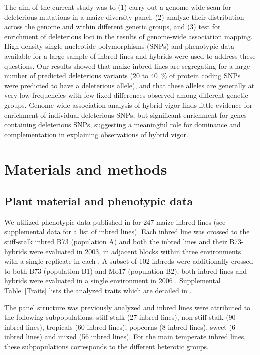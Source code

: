 \documentclass[12pt]{article}
\begin{document}
The aim of the current study was to (1) carry out a genome-wide scan for deleterious mutations in a maize diversity panel, (2) analyze their distribution across the genome and within different genetic groups, and (3) test for enrichment of deleterious loci in the results of genome-wide association mapping. High density single nucleotide polymorphisms (SNPs) and phenotypic data available for a large sample of inbred lines and hybrids were used to address these questions. Our results showed that maize inbred lines are segregating for a large number of predicted deleterious variants (20 to 40 \,\% of protein coding SNPs were predicted to have a deleterious allele), and that these alleles are generally at very low frequencies with few fixed differences observed among different genetic groups. Genome-wide association analysis of hybrid vigor finds little evidence for enrichment of individual deleterious SNPs, but significant enrichment for genes containing deleterious SNPs, suggesting a meaningful role for dominance and complementation in explaining observations of hybrid vigor. 

\section*{Materials and methods}
\subsection*{Plant material and phenotypic data}

We utilized phenotypic data published in \citet{Flint-Garcia2005} for 247 maize inbred lines (see supplemental data for a list of inbred lines). Each inbred line was crossed to the stiff-stalk inbred B73 (population A) and both the inbred lines and their B73-hybrids were evaluated in 2003, in adjacent blocks within three environments with a single replicate in each \citep{Flint-Garcia2009}. A subset of 102 inbreds were additionally crossed to both B73 (population B1) and Mo17 (population B2); both inbred lines and hybrids were evaluated in a single environment in 2006 \citep{Flint-Garcia2009}. Supplemental Table~\ref{Traits} lists the analyzed traits which are detailed in \citet{Flint-Garcia2009}.

The panel structure was previously analyzed \citep{Flint-Garcia2005} and inbred lines were attributed to the following subpopulations: stiff-stalk (27 inbred lines), non stiff-stalk (90 inbred lines), tropicals (60 inbred lines), popcorns (8 inbred lines), sweet (6 inbred lines) and mixed (56 inbred lines). For the main temperate inbred lines, these subpopulations corresponds to the different heterotic groups.
\end{document}
